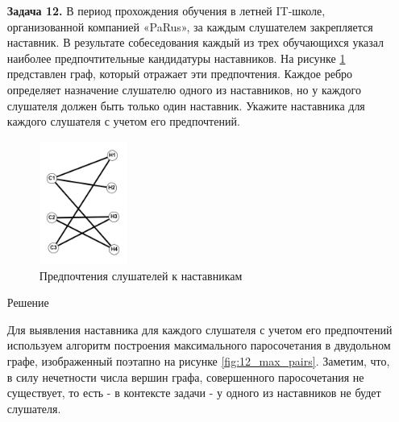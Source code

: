 \documentclass{article}
\begin{document}
\clearpage%
\begin{enumerate}
\item[\textbf{Задача 12.}]В период прохождения обучения в летней IT-школе, организованной компанией «PaRus», за каждым слушателем закрепляется наставник. В результате собеседования каждый из трех обучающихся указал наиболее предпочтительные кандидатуры наставников. На рисунке \ref{fig:12_initree} представлен граф, который отражает эти предпочтения. Каждое ребро определяет назначение слушателю одного из наставников, но у каждого слушателя должен быть только один наставник. Укажите наставника для каждого слушателя с учетом его предпочтений.
\begin{figure}[ht]
    \includegraphics[width=0.27\textwidth, center]{attachments/12/12_graph.png}
    \caption{Предпочтения слушателей к наставникам}
    \label{fig:12_initree}
\end{figure}
\begin{center}
Решение 
\end{center}
Для выявления наставника для каждого слушателя с учетом его предпочтений используем алгоритм построения максимального паросочетания в двудольном графе, изображенный поэтапно на рисунке \ref{fig:12_max_pairs}. Заметим, что, в силу нечетности числа вершин графа, совершенного паросочетания не существует, то есть - в контексте задачи - у одного из наставников не будет слушателя.

\end{enumerate}
\end{document}
